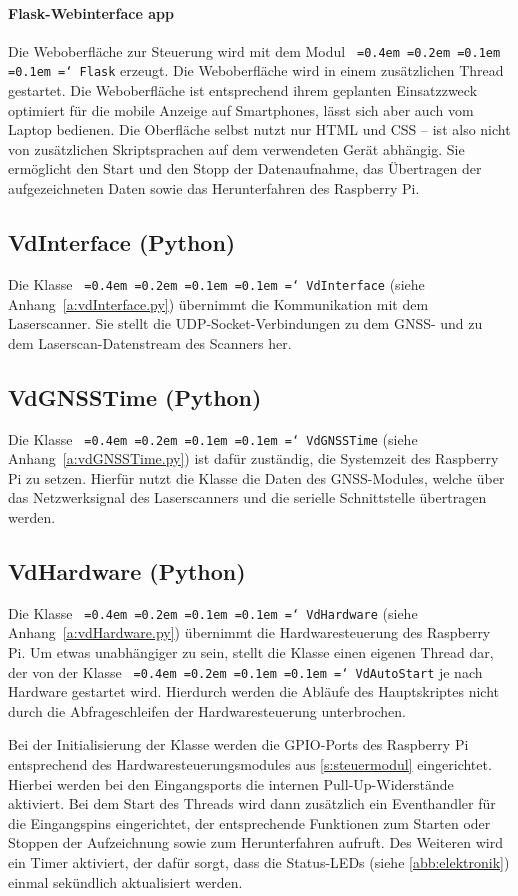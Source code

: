 \documentclass[a4paper,12pt,bibliography=totoc, listof=totoc,titlepage,pointlessnumbers]{scrreprt}
\newcommand*\justify{%
  \fontdimen2\font=0.4em%
  \fontdimen3\font=0.2em%
  \fontdimen4\font=0.1em%
  \fontdimen7\font=0.1em%
  \hyphenchar\font=`\-%
}
\newcommand{\code}[1]{\texttt{\justify{#1}}}
\begin{document}
\paragraph{Flask-Webinterface app}
Die Weboberfläche zur Steuerung wird mit dem Modul \code{Flask} erzeugt. Die Weboberfläche wird in einem zu\-sätz\-lichen Thread gestartet. Die Weboberfläche ist entsprechend ihrem geplanten Einsatzzweck optimiert für die mobile Anzeige auf Smartphones, lässt sich aber auch vom Laptop bedienen. Die Oberfläche selbst nutzt nur HTML und CSS -- ist also nicht von zu\-sätz\-lichen Skriptsprachen auf dem verwendeten Gerät abhängig.  Sie ermöglicht den Start und den Stopp der Datenaufnahme, das Übertragen der aufgezeichneten Daten sowie das Herunterfahren des Raspberry Pi.

\subsection{VdInterface (Python)}
Die Klasse \code{VdInterface} (siehe Anhang~\ref{a:vdInterface.py}) übernimmt die Kommunikation mit dem Laser\-scan\-ner. Sie stellt die UDP-Socket-Verbindungen zu dem GNSS- und zu dem Laserscan-Datenstream des Scanners her.

\subsection{VdGNSSTime (Python)}
Die Klasse \code{VdGNSSTime} (siehe Anhang~\ref{a:vdGNSSTime.py}) ist dafür zuständig, die Systemzeit des Rasp\-berry Pi zu setzen. Hierfür nutzt die Klasse die Daten des GNSS-Modules, welche über das Netzwerksignal des Laserscanners und die serielle Schnittstelle übertragen werden. 

\subsection{VdHardware (Python)}
Die Klasse \code{VdHardware} (siehe Anhang~\ref{a:vdHardware.py}) übernimmt die Hardwaresteuerung des Rasp\-berry Pi. Um etwas unabhängiger zu sein, stellt die Klasse einen eigenen Thread dar, der von der Klasse \code{VdAutoStart} je nach Hardware gestartet wird. Hierdurch werden die Abläufe des Hauptskriptes nicht durch die Abfrageschleifen der Hardwaresteuerung unterbrochen.

Bei der Initialisierung der Klasse werden die GPIO-Ports des Rasp\-berry Pi entsprechend des Hardwaresteuerungsmodules aus \autoref{s:steuermodul} eingerichtet. Hierbei werden bei den Ein\-gangs\-ports die internen Pull-Up-Widerstände aktiviert. Bei dem Start des Threads wird dann zu\-sätz\-lich ein Event\-handler für die Ein\-gang\-spins eingerichtet, der entsprechende Funktionen zum Starten oder Stoppen der Aufzeichnung sowie zum Herunterfahren aufruft. Des Weiteren wird ein Timer aktiviert, der dafür sorgt, dass die Status-LEDs (siehe \autoref{abb:elektronik}) einmal sekündlich aktualisiert werden.
\end{document}
